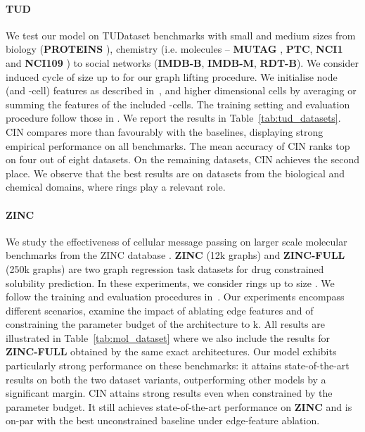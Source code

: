 \documentclass{article}
\begin{document}
\paragraph{TUD} We test our model on  TUDataset benchmarks \citep{morris2020tudataset} with small and medium sizes from biology (\textbf{PROTEINS}  \citep{dobson2003distinguishing,borgwardt2005protein}), chemistry (i.e. molecules -- \textbf{MUTAG} \citep{kazius2005derivation,riesen2008iam}, \textbf{PTC}, \textbf{NCI1} and \textbf{NCI109} \citep{wale2008comparison}) to social networks (\textbf{IMDB-B}, \textbf{IMDB-M}, \textbf{RDT-B}). 
We consider induced cycle of size up to  for our graph lifting procedure. We initialise node (and -cell) features as described in~\citet{GIN}, and higher dimensional cells by averaging or summing the features of the included -cells. The training setting and evaluation procedure follow those in \citet{GIN}. 
We report the results in Table~\ref{tab:tud_datasets}. CIN compares more than favourably with the baselines, displaying strong empirical performance on all benchmarks. The mean accuracy of CIN ranks top on four out of eight datasets. On the remaining datasets, CIN achieves the second place. We observe that the best results are on datasets from the biological and chemical domains, where rings play a relevant role.


\paragraph{ZINC} 
We study the effectiveness of cellular message passing on larger scale molecular benchmarks from the ZINC database \citep{ZINCdataset}. \textbf{ZINC} (12k graphs) and \textbf{ZINC-FULL} (250k graphs) \citep{dwivedi2020benchmarkgnns,jin2018junction,you2018graph,gomez2018automatic} are two graph regression task datasets for drug constrained solubility prediction. In these experiments, we consider rings up to size . We follow the training and evaluation procedures in~\citep{dwivedi2020benchmarkgnns}. Our experiments encompass different scenarios, examine the impact of ablating edge features and of constraining the parameter budget of the architecture to k. All results are illustrated in Table~\ref{tab:mol_dataset} where we also include the results for \textbf{ZINC-FULL} obtained by the same exact architectures. Our model exhibits particularly strong performance on these benchmarks: it attains state-of-the-art results on both the two dataset variants, outperforming other models by a significant margin. CIN attains strong results even when constrained by the parameter budget. It still achieves state-of-the-art performance on \textbf{ZINC} and is on-par with the best unconstrained baseline under edge-feature ablation. 
\end{document}
